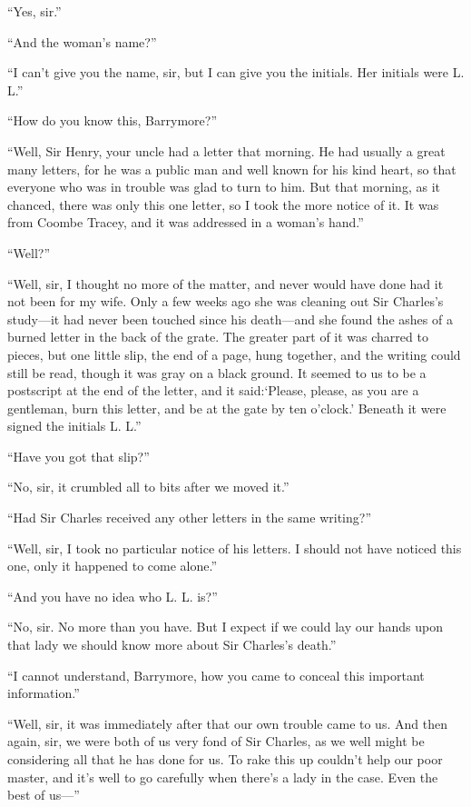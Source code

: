 \enquote{Yes, sir.}

\enquote{And the woman's name?}

\enquote{I can't give you the name, sir, but I can give you the initials. Her initials were L. L.}

\enquote{How do you know this, Barrymore?}

\enquote{Well, Sir Henry, your uncle had a letter that morning. He had usually a great many letters, for he was a public man and well known for his kind heart, so that everyone who was in trouble was glad to turn to him. But that morning, as it chanced, there was only this one letter, so I took the more notice of it. It was from Coombe Tracey, and it was addressed in a woman's hand.}

\enquote{Well?}

\enquote{Well, sir, I thought no more of the matter, and never would have done had it not been for my wife. Only a few weeks ago she was cleaning out Sir Charles's study---it had never been touched since his death---and she found the ashes of a burned letter in the back of the grate. The greater part of it was charred to pieces, but one little slip, the end of a page, hung together, and the writing could still be read, though it was gray on a black ground. It seemed to us to be a postscript at the end of the letter, and it said:\enquote{Please, please, as you are a gentleman, burn this letter, and be at the gate by ten o'clock.} Beneath it were signed the initials L. L.}

\enquote{Have you got that slip?}

\enquote{No, sir, it crumbled all to bits after we moved it.}

\enquote{Had Sir Charles received any other letters in the same writing?}

\enquote{Well, sir, I took no particular notice of his letters. I should not have noticed this one, only it happened to come alone.}

\enquote{And you have no idea who L. L. is?}

\enquote{No, sir. No more than you have. But I expect if we could lay our hands upon that lady we should know more about Sir Charles's death.}

\enquote{I cannot understand, Barrymore, how you came to conceal this important information.}

\enquote{Well, sir, it was immediately after that our own trouble came to us. And then again, sir, we were both of us very fond of Sir Charles, as we well might be considering all that he has done for us. To rake this up couldn't help our poor master, and it's well to go carefully when there's a lady in the case. Even the best of us---}

